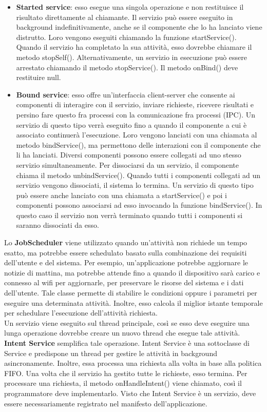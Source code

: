 \begin{itemize}
\item \textbf{Started service}: esso esegue una singola operazione e non restituisce il risultato direttamente al chiamante. Il servizio può essere eseguito in background indefinitivamente, anche se il componente che lo ha lanciato viene distrutto. Loro vengono eseguiti chiamando la funzione startService(). Quando il servizio ha completato la sua attività, esso dovrebbe chiamare il metodo stopSelf(). Alternativamente, un servizio in esecuzione può essere arrestato chiamando il metodo stopService(). Il metodo onBind() deve restituire null.
\item \textbf{Bound service}: esso offre un'interfaccia client-server che consente ai componenti di interagire con il servizio, inviare richieste, ricevere risultati e persino fare questo fra processi con la comunicazione fra processi (IPC). Un servizio di questo tipo verrà eseguito fino a quando il componente a cui è associato continuerà l'esecuzione. Loro vengono lanciati con una chiamata al metodo bindService(), ma permettono delle interazioni con il componente che li ha lanciati. Diversi componenti possono essere collegati ad uno stesso servizio simultaneamente. Per dissociarsi da un servizio, il componente chiama il metodo unbindService(). Quando tutti i componenti collegati ad un servizio vengono dissociati, il sistema lo termina. Un servizio di questo tipo può essere anche lanciato con una chiamata a startService() e poi i componenti possono associarsi ad esso invocando la funzione bindService(). In questo caso il servizio non verrà terminato quando tutti i componenti si saranno dissociati da esso.
\end{itemize}
Lo \textbf{JobScheduler} viene utilizzato quando un'attività non richiede un tempo esatto, ma potrebbe essere schedulato basato sulla combinazione dei requisiti dell'utente e del sistema. Per esempio, un'applicazione potrebbe aggiornare le notizie di mattina, ma potrebbe attende fino a quando il dispositivo sarà carico e connesso al wifi per aggiornarle, per preservare le risorse del sistema e i dati dell'utente. Tale classe permette di stabilire le condizioni oppure i parametri per eseguire una determinata attività. Inoltre, esso calcola il miglior istante temporale per schedulare l'esecuzione dell'attività richiesta. \\Un servizio viene eseguito sul thread principale, così se esso deve eseguire una lunga operazione dovrebbe creare un nuovo thread che esegue tale attività. \textbf{Intent Service} semplifica tale operazione. Intent Service è una sottoclasse di Service e predispone un thread per gestire le attività in background asincronamente. Inoltre, essa processa una richiesta alla volta in base alla politica FIFO. Una volta che il servizio ha gestito tutte le richieste, esso termina. Per processare una richiesta, il metodo onHandleIntent() viene chiamato, così il programmatore deve implementarlo. Visto che Intent Service è un servizio, deve essere necessariamente registrato nel manifesto dell'applicazione.
